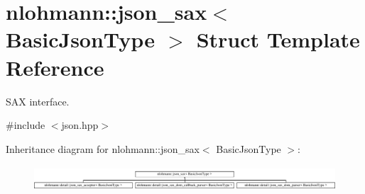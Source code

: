 \hypertarget{structnlohmann_1_1json__sax}{}\section{nlohmann\+:\+:json\+\_\+sax$<$ Basic\+Json\+Type $>$ Struct Template Reference}
\label{structnlohmann_1_1json__sax}


S\+AX interface.  




{\ttfamily \#include $<$json.\+hpp$>$}

Inheritance diagram for nlohmann\+:\+:json\+\_\+sax$<$ Basic\+Json\+Type $>$\+:\begin{figure}[H]
\begin{center}
\leavevmode
\includegraphics[height=0.926385cm]{structnlohmann_1_1json__sax}
\end{center}
\end{figure}
